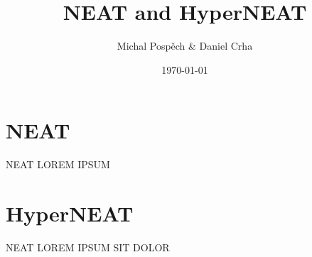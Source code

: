 \documentclass{beamer}
\begin{document}
\title{NEAT and HyperNEAT}   
\author{Michal Pospěch \& Daniel Crha} 
\date{\today}

\maketitle

\section{NEAT} 
\begin{frame}{NEAT}
    LOREM IPSUM
    
\end{frame}
\section{HyperNEAT}
\begin{frame}{NEAT}
    LOREM IPSUM SIT DOLOR
    
\end{frame}
\end{document}
